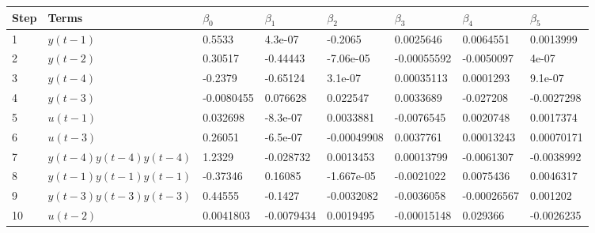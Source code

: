 \begin{tabular}{llllllll}
Step & Terms & $\beta_{0}$ & $\beta_{1}$ & $\beta_{2}$ & $\beta_{3}$ & $\beta_{4}$ & $\beta_{5}$ \\ 
\hline 
1 & $y(t-1)$ & 0.5533 & 4.3e-07 & -0.2065 & 0.0025646 & 0.0064551 & 0.0013999 \\ 
2 & $y(t-2)$ & 0.30517 & -0.44443 & -7.06e-05 & -0.00055592 & -0.0050097 & 4e-07 \\ 
3 & $y(t-4)$ & -0.2379 & -0.65124 & 3.1e-07 & 0.00035113 & 0.0001293 & 9.1e-07 \\ 
4 & $y(t-3)$ & -0.0080455 & 0.076628 & 0.022547 & 0.0033689 & -0.027208 & -0.0027298 \\ 
5 & $u(t-1)$ & 0.032698 & -8.3e-07 & 0.0033881 & -0.0076545 & 0.0020748 & 0.0017374 \\ 
6 & $u(t-3)$ & 0.26051 & -6.5e-07 & -0.00049908 & 0.0037761 & 0.00013243 & 0.00070171 \\ 
7 & $y(t-4)y(t-4)y(t-4)$ & 1.2329 & -0.028732 & 0.0013453 & 0.00013799 & -0.0061307 & -0.0038992 \\ 
8 & $y(t-1)y(t-1)y(t-1)$ & -0.37346 & 0.16085 & -1.667e-05 & -0.0021022 & 0.0075436 & 0.0046317 \\ 
9 & $y(t-3)y(t-3)y(t-3)$ & 0.44555 & -0.1427 & -0.0032082 & -0.0036058 & -0.00026567 & 0.001202 \\ 
10 & $u(t-2)$ & 0.0041803 & -0.0079434 & 0.0019495 & -0.00015148 & 0.029366 & -0.0026235 \\ 
\hline 
\end{tabular}